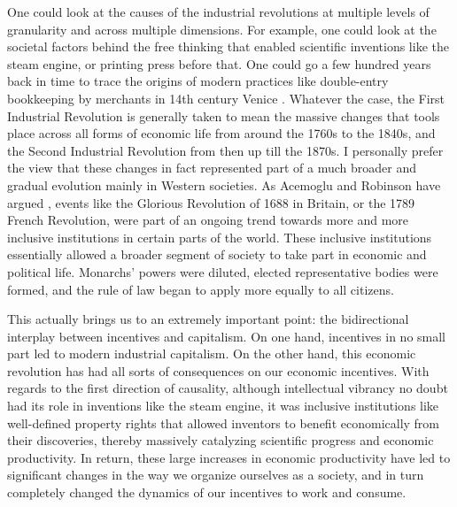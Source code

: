 \documentclass[12pt]{memoir}
\begin{document}
			One could look at the causes of the industrial revolutions at multiple levels of granularity and across multiple dimensions. For example, one could look at the societal factors behind the free thinking 
			that enabled scientific inventions like the steam engine, or printing press before that. One could go a few hundred years back in time to trace the origins of modern practices like double-entry 
			bookkeeping by merchants in 14th century Venice \cite{VeniceMerchants}. Whatever the case, the First Industrial Revolution is generally taken to mean the massive changes that tools place
			across all forms of economic life from around the 1760s to the 1840s, and the Second Industrial Revolution from then up till the 1870s. I personally prefer the view that these changes 
			in fact represented part of a much broader and gradual evolution mainly in Western societies. As Acemoglu and Robinson have argued \cite{WhyNationsFail}, events like the Glorious Revolution of 1688
			in Britain, or the 1789 French Revolution, were part of an ongoing trend towards more and more inclusive institutions in certain parts of the world. These inclusive institutions essentially allowed a broader 
			segment of society to take part in economic and political life. Monarchs' powers were diluted, elected representative bodies were formed, and the rule of law began to apply more equally to all citizens.\
			
			This actually brings us to an extremely important point: the bidirectional interplay between incentives and capitalism. On one hand, incentives in no small part led to modern industrial capitalism. On the 
			other hand, this economic revolution has had all sorts of consequences on our economic incentives. With regards to the first direction of causality, although intellectual vibrancy no doubt had its role in 
			inventions like the steam engine, it was inclusive institutions like  well-defined property rights that allowed inventors to benefit economically from their discoveries, thereby massively 
			catalyzing scientific progress and economic productivity. In return, these large increases in economic productivity have led to significant changes in the way we organize ourselves as a 
			society, and in turn completely changed the dynamics of our incentives to work and consume.\
			
			
			
\end{document}
